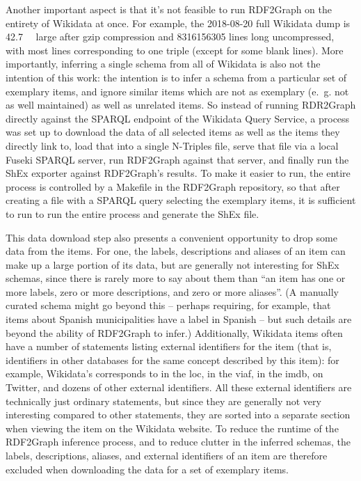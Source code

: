 Another important aspect is that it’s not feasible to run RDF2Graph on the entirety of Wikidata at once.
For example, the 2018-08-20 full Wikidata dump is \SI{42.7}{\giga\byte} large after gzip compression %
and \num{8316156305} lines long uncompressed,
with most lines corresponding to one triple (except for some blank lines).
More importantly, inferring a single schema from all of Wikidata is also not the intention of this work:
the intention is to infer a schema from a particular set of exemplary items, %
and ignore similar items which are not as exemplary (e.~g. not as well maintained)
as well as unrelated items. %
So instead of running RDR2Graph directly against the SPARQL endpoint of the Wikidata Query Service,
a process was set up %
to download the data of all selected items as well as the items they directly link to,
load that into a single N-Triples file,
serve that file via a local Fuseki SPARQL server,
run RDF2Graph against that server,
and finally run the ShEx exporter against RDF2Graph’s results.
To make it easier to run, the entire process is controlled by a Makefile in the RDF2Graph repository,
so that after creating a  file with a SPARQL query selecting the exemplary items,
it is sufficient to run  to run the entire process and generate the ShEx file.

This data download step also presents a convenient opportunity to drop some data from the items.
For one, the labels, descriptions and aliases of an item can make up a large portion of its data,
but are generally not interesting for ShEx schemas,
since there is rarely more to say about them than
“an item has one or more labels, zero or more descriptions, and zero or more aliases”. %
(A manually curated schema might go beyond this –
perhaps requiring, for example, that items about Spanish municipalities have a label in Spanish –
but such details are beyond the ability of RDF2Graph to infer.)
Additionally, Wikidata items often have a number of statements listing external identifiers for the item
(that is, identifiers in other databases for the same concept described by this item):
for example, Wikidata’s  corresponds to  in the \gls{loc},
 in the \gls{viaf},
 in the \gls{imdb},
 on Twitter,
and dozens of other external identifiers. %
All these external identifiers are technically just ordinary statements,
but since they are generally not very interesting compared to other statements,
they are sorted into a separate section when viewing the item on the Wikidata website.
To reduce the runtime of the RDF2Graph inference process,
and to reduce clutter in the inferred schemas,
the labels, descriptions, aliases, and external identifiers of an item
are therefore excluded when downloading the data for a set of exemplary items.

